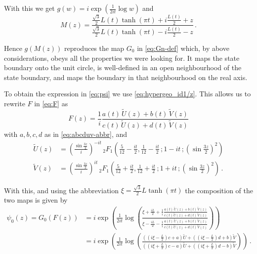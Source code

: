 \documentclass[11pt,a4paper]{article}
\numberwithin{equation}{section}
\begin{document}
\noindent 
With this we get $g(w) = i\exp\left(\frac{1}{2it} \log w \right)$ and 
%
\begin{equation}
    M(z) = \frac{\frac{\sqrt{3}}{2} L(t) \tanh(\pi t) + i\frac{L(t)}{2} + z}{\frac{\sqrt{3}}{2} L(t) \tanh(\pi t) - i\frac{L(t)}{2} - z}\,.
\end{equation}

\noindent 
Hence $g(M(z))$ reproduces the map $G_0$ in \eqref{eq:Gn-def} which, by above considerations, obeys all the properties we were looking for. It maps the state boundary onto the unit circle, is well-defined in an open neighbourhood of the state boundary, and maps the boundary in that neighbourhood on the real axis. 

\medskip

To obtain the expression in \eqref{eq:psi} we use \eqref{eq:hypergeo_id1/z}. 
This allows us to rewrite $F$ in \eqref{eq:F} as
%
\begin{equation}
    F(z) = \frac{1}{i} \frac{a(t) \,\tilde{U}(z) + b(t) \,\tilde{V}(z)}{c(t)\, \tilde{U}(z) + d(t)\, \tilde{V}(z)}
\end{equation}
%
with $a,b,c,d$ as in \eqref{eq:abcduv-abbr}, and 
%
\begin{align}
   \tilde{U}(z) &= \left(\frac{\sin\frac{3z}{2}}{i}\right)^{-it} \,_2F_1 \left(\frac{5}{12}-\frac{it}{2},\frac{1}{12}-\frac{it}{2}\,;1-it\,;
       \left(\sin\frac{3z}{2}\right)^2
   \right)
   \nonumber \\
   \tilde{V}(z) &= \left(\frac{\sin\frac{3z}{2}}{i}\right)^{it} \,_2F_1 \left(\frac{5}{12}+\frac{it}{2},\frac{1}{12}+\frac{it}{2}\,;1+it\,;
       \left(\sin\frac{3z}{2}\right)^2
   \right) 
   \,.
\end{align}

\noindent 
With this, and using the abbreviation $\xi = \frac{\sqrt{3}}{2} L \tanh\left(\pi t\right)$ the composition of the two maps is given by
%
\begin{align}
    \psi_0(z) = G_0(F(z)) &= i \exp\left(\frac{1}{2it} \log\left(\frac{\xi+\frac{iL}{2} + \frac{1}{i} \frac{a(t) \,\tilde{U}(z) + b(t) \,\tilde{V}(z)}{c(t) \,\tilde{U}(z) + d(t) \,\tilde{V}(z)}}{\xi-\frac{iL}{2} - \frac{1}{i} \frac{a(t) \,\tilde{U}(z) + b(t) \,\tilde{V}(z)}{c(t) \,\tilde{U}(z) + d(t) \,\tilde{V}(z)}}\right)\right)
    \nonumber\\
    &= i \exp\left(\frac{1}{2it} \log\left(\frac{\left(\left(i\xi-\frac{L}{2}\right) c + a\right)\tilde{U}  + \left(\left(i\xi-\frac{L}{2}\right) d + b\right)\tilde{V}}{\left(\left(i\xi+\frac{L}{2}\right) c - a\right)\tilde{U}  + \left(\left(i\xi+\frac{L}{2}\right) d - b\right)\tilde{V}}\right)\right)\,.
\end{align}
\end{document}
